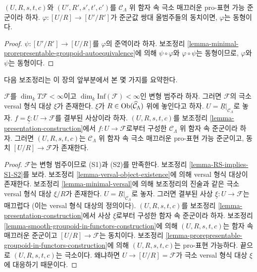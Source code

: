 \begin{lemma}
\label{lemma-minimal-prorepresentable-groupoid-equivalence}
$(U, R, s, t, c)$와 $(U', R', s', t', c')$를
$\mathcal{C}_\Lambda$ 위 함자 속 극소 매끄러운
pro-표현 가능 준군이라 하자.
$\varphi : [U/R] \to [U'/R']$가 준군값 쌍대 올범주들의 동치이면,
$\varphi$는 동형이다.
\end{lemma}

\begin{proof}
$\psi : [U'/R'] \to [U/R]$를 $\varphi$의 준역이라 하자.
보조정리 \ref{lemma-minimal-prorepresentable-groupoid-autoequivalence}에 의해
$\psi \circ \varphi$와 $\varphi \circ \psi$는 동형이므로,
$\varphi$와 $\psi$는 동형이다.
\end{proof}

\noindent
다음 보조정리는 이 장의 앞부분에서 본 몇 가지를 요약한다.

\begin{lemma}
\label{lemma-minimal-groupoid-in-functors-construction}
$\mathcal{F}$를
$\dim_k T\mathcal{F} <\infty$이고
$\dim_k \text{Inf}(\mathcal{F}) < \infty$인 변형 범주라 하자.
그러면 $\mathcal{F}$의 극소 versal 형식 대상 $\xi$가 존재한다.
$\xi$가 $R \in \mathop{\mathrm{Ob}}\nolimits(\widehat{\mathcal{C}}_\Lambda)$ 위에 놓인다고 하자.
$U = \underline{R}|_{\mathcal{C}_\Lambda}$로 놓자.
$f = \underline{\xi} : U \to \mathcal{F}$를 결부된 사상이라 하자.
$(U, R, s, t, c)$를 보조정리
\ref{lemma-presentation-construction}에서 $f : U \to \mathcal{F}$로부터
구성한 $\mathcal{C}_\Lambda$ 위 함자 속 준군이라 하자.
그러면 $(U, R, s, t, c)$는 $\mathcal{C}_\Lambda$ 위 함자 속
극소 매끄러운 pro-표현 가능 준군이고,
동치 $[U/R] \to \mathcal{F}$가 존재한다.
\end{lemma}

\begin{proof}
$\mathcal{F}$는 변형 범주이므로 (S1)과 (S2)를 만족한다.
보조정리 \ref{lemma-RS-implies-S1-S2}를 보라. 보조정리
\ref{lemma-versal-object-existence}에 의해 versal 형식 대상이 존재한다.
보조정리 \ref{lemma-minimal-versal}에 의해 보조정리의 진술과 같은
극소 versal 형식 대상 $\xi/R$가 존재한다.
$U = \underline{R}|_{\mathcal{C}_\Lambda}$로 놓자. 그러면 결부된 사상
$\underline{\xi} : U \to \mathcal{F}$는 매끄럽다
(이는 versal 형식 대상의 정의이다).
$(U, R, s, t, c)$를 보조정리
\ref{lemma-presentation-construction}에서 사상 $\underline{\xi}$로부터
구성한 함자 속 준군이라 하자. 보조정리
\ref{lemma-smooth-groupoid-in-functors-construction}에 의해
$(U, R, s, t, c)$는 함자 속 매끄러운 준군이고
$[U/R] \to \mathcal{F}$는 동치이다. 보조정리
\ref{lemma-prorepresentable-groupoid-in-functors-construction}에 의해
$(U, R, s, t, c)$는 pro-표현 가능하다.
끝으로 $(U, R, s, t, c)$는 극소이다. 왜냐하면
$U \to [U/R] = \mathcal{F}$가 극소 versal 형식 대상 $\xi$에
대응하기 때문이다.
\end{proof}

